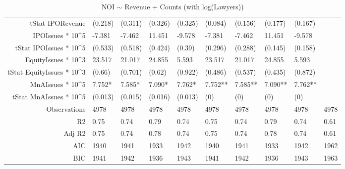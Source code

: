 \begin{table}[ht]
\begin{tabular}{rlllllllll}
  tStat IPORevenue & (0.218) & (0.311) & (0.326) & (0.325) & (0.084) & (0.156) & (0.177) & (0.167) &  \\ 
  IPOIssues * 10^5 & -7.381 & -7.462 & 11.451 & -9.578 & -7.381 & -7.462 & 11.451 & -9.578 &  \\ 
  tStat IPOIssues * 10^5 & (0.533) & (0.518) & (0.424) & (0.39) & (0.296) & (0.288) & (0.145) & (0.158) &  \\ 
  EquityIssues * 10^3 & 23.517 & 21.017 & 24.855 & 5.593 & 23.517 & 21.017 & 24.855 & 5.593 &  \\ 
  tStat EquityIssues * 10^3 & (0.66) & (0.701) & (0.62) & (0.922) & (0.486) & (0.537) & (0.435) & (0.872) &  \\ 
  MnAIssues * 10^5 & 7.752* & 7.585* & 7.090* & 7.762* & 7.752** & 7.585** & 7.090** & 7.762** &  \\ 
  tStat MnAIssues * 10^5 & (0.013) & (0.015) & (0.016) & (0.013) & (0) & (0) & (0) & (0) &  \\ 
  Observations & 4978 & 4978 & 4978 & 4978 & 4978 & 4978 & 4978 & 4978 & 4978 \\ 
  R2 & 0.75 & 0.74 & 0.79 & 0.74 & 0.75 & 0.74 & 0.79 & 0.74 & 0.61 \\ 
  Adj R2 & 0.75 & 0.74 & 0.78 & 0.74 & 0.75 & 0.74 & 0.78 & 0.74 & 0.61 \\ 
  AIC & 1940 & 1941 & 1933 & 1942 & 1940 & 1941 & 1933 & 1942 & 1962 \\ 
  BIC & 1941 & 1942 & 1936 & 1943 & 1941 & 1942 & 1936 & 1943 & 1963 \\ 
   \hline
\end{tabular}
\caption{NOI $\sim$ Revenue + Counts (with log(Lawyers))} 
\end{table}
